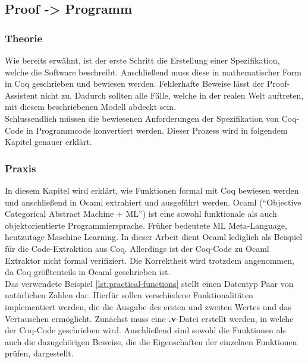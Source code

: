 \subsection{Proof -> Programm}
\subsubsection{Theorie}
{Wie bereits erwähnt, ist der erste Schritt die Erstellung einer Spezifikation, welche die Software beschreibt. Anschließend muss diese in mathematischer Form in Coq geschrieben und bewiesen werden. Fehlerhafte Beweise lässt der Proof-Assistent nicht zu.
Dadurch sollten alle Fälle, welche in der realen Welt auftreten, mit diesem beschriebenen Modell abdeckt sein.\\
Schlussendlich müssen die bewiesenen Anforderungen der Spezifikation von Coq-Code in Programmcode konvertiert werden. Dieser Prozess wird in folgendem Kapitel genauer erklärt.}\cite{HELWER01:FV}

\subsubsection{Praxis}
In diesem Kapitel wird erklärt, wie Funktionen formal mit Coq bewiesen werden und anschließend in Ocaml extrahiert und ausgeführt werden. Ocaml ("`Objective Categorical Abstract Machine + ML"') ist eine sowohl funktionale als auch objektorientierte Programmiersprache. Früher bedeutete ML Meta-Language, heutzutage Maschine Learning. In dieser Arbeit dient Ocaml lediglich als Beispiel für die Code-Extraktion aus Coq. Allerdings ist der Coq-Code zu Ocaml Extraktor nicht formal verifiziert. Die Korrektheit wird trotzdem angenommen, da Coq größtenteils in Ocaml geschrieben ist.\\
Das verwendete Beispiel \ref{lst:practical-functions} stellt einen Datentyp Paar von natürlichen Zahlen dar. Hierfür sollen verschiedene Funktionalitäten implementiert werden, die die Ausgabe des ersten und zweiten Wertes und das Vertauschen ermöglicht.
Zunächst muss eine \textbf{.v}-Datei erstellt werden, in welche der Coq-Code geschrieben wird. Anschließend sind sowohl die Funktionen als auch die dazugehörigen Beweise, die die Eigenschaften der einzelnen Funktionen prüfen, dargestellt.

